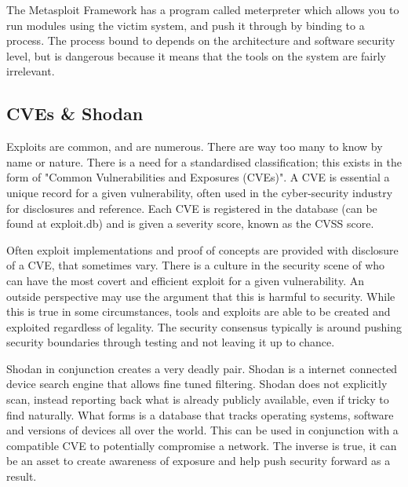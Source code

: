 The Metasploit Framework has a program called meterpreter which allows you to run modules using the victim system, and push it through by binding to a process. The process bound to depends on the architecture and software security level, but is dangerous
because it means that the tools on the system are fairly irrelevant. 

\subsection{CVEs \& Shodan}
Exploits are common, and are numerous. There are way too many to know by name or nature. There is a need for a standardised classification; this exists in the form of "Common Vulnerabilities and Exposures (CVEs)". A CVE is essential a unique record for a given vulnerability,
often used in the cyber-security industry for disclosures and reference. Each CVE is registered in the database (can be found at exploit.db) and is given a severity score, known as the CVSS score. 

Often exploit implementations and proof of concepts are provided with disclosure of a CVE, that sometimes vary.
There is a culture in the security scene of who can have the most covert and efficient exploit for a given vulnerability. An outside perspective may use the argument that this is harmful to security. While this is true in some circumstances, tools and exploits are able to be created and exploited regardless of legality.
The security consensus typically is around pushing security boundaries through testing and not leaving it up to chance. 


Shodan in conjunction creates a very deadly pair. Shodan is a internet connected device search engine that allows fine tuned filtering.
Shodan does not explicitly scan, instead reporting back what is already publicly available, even if tricky to find naturally. What forms is a database that 
tracks operating systems, software and versions of devices all over the world. This can be used in conjunction with a compatible CVE to potentially compromise a network.
The inverse is true, it can be an asset to create awareness of exposure and help push security forward as a result.


